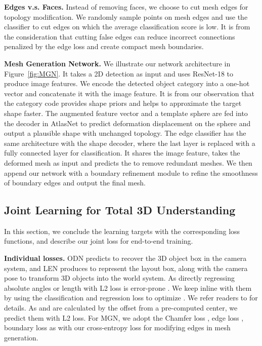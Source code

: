 \documentclass[10pt,twocolumn,letterpaper]{article}
\begin{document}
\noindent\textbf{Edges v.s. Faces.} Instead of removing faces, we choose to cut mesh edges for topology modification. We randomly sample points on mesh edges and use the classifier  to cut edges on which the average classification score is low. It is from the consideration that cutting false edges can reduce incorrect connections penalized by the edge loss \cite{wang2018pixel2mesh} and create compact mesh boundaries.

\noindent\textbf{Mesh Generation Network.} We illustrate our network architecture in Figure~\ref{fig:MGN}. It takes a 2D detection as input and uses ResNet-18 to produce image features. We encode the detected object category into a one-hot vector and concatenate it with the image feature. It is from our observation that the category code provides shape priors and helps to approximate the target shape faster. The augmented feature vector and a template sphere are fed into the decoder in AtlasNet \cite{groueix2018} to predict deformation displacement on the sphere and output a plausible shape with unchanged topology. The edge classifier has the same architecture with the shape decoder, where the last layer is replaced with a fully connected layer for classification. It shares the image feature, takes the deformed mesh as input and predicts the  to remove redundant meshes.
We then append our network with a boundary refinement module \cite{Junyi} to refine the smoothness of boundary edges and output the final mesh.

\subsection{Joint Learning for Total 3D Understanding}
\label{sec:joint}
In this section, we conclude the learning targets with the corresponding loss functions, and describe our joint loss for end-to-end training.

\noindent\textbf{Individual losses.} ODN predicts  to recover the 3D object box in the camera system, and LEN produces  to represent the layout box, along with the camera pose to transform 3D objects into the world system. As directly regressing absolute angles or length with L2 loss is error-prone \cite{huang2018cooperative,qi2018frustum}. We keep inline with them by using the classification and regression loss  to optimize . We refer readers to \cite{huang2018cooperative} for details. As  and  are calculated by the offset from a pre-computed center, we predict them with L2 loss. For MGN, we adopt the Chamfer loss , edge loss , boundary loss  as \cite{groueix2018,wang2018pixel2mesh,Junyi} with our cross-entropy loss  for modifying edges in mesh generation.
\end{document}
